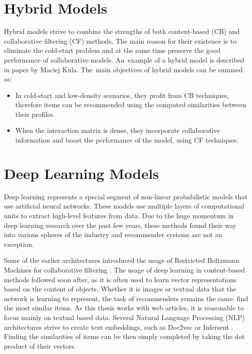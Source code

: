 \section{Hybrid Models} \label{hybrid_models}

Hybrid models strive to combine the strengths of both content-based (CB) and collaborative filtering (CF) methods. The main reason for their existence is to eliminate the cold-start problem and at the same time preserve the good performance of collaborative models. An~example of a hybrid model is described in paper \cite{LightFM} by Maciej Kula. 
The~main objectives of hybrid models can be summed as:

\begin{itemize}
    \item In cold-start and low-density scenarios, they profit from CB techniques, therefore items can be recommended using the computed similarities between their profiles.
    
    \item When the interaction matrix is dense, they incorporate collaborative information and boost the performance of the model, using CF techniques.
\end{itemize}


\section{Deep Learning Models} \label{deep_learning}
Deep learning represents a special segment of non-linear probabilistic models that use artificial neural networks. These models use multiple layers of computational units to extract high-level features from data. Due to the huge momentum in deep learning research over the past few years, these methods found their way into various spheres of the industry and recommender systems are not an exception. 

Some of the earlier architectures introduced the usage of Restricted Boltzmann Machines for collaborative filtering \cite{Boltzmann}. The usage of deep learning in content-based methods followed soon after, as it is often used to learn vector representations based on the content of objects. Whether it is images or textual data that the network is learning to represent, the task of recommenders remains the same: find the most similar items. As this thesis works with web articles, it is reasonable to focus mainly on textual based data. Several Natural Language Processing (NLP) architectures strive to create text embeddings, such as Doc2vec \cite{Doc2Vec} or Infersent \cite{InferSent}. Finding the similarities of items can be then simply completed by taking the dot product of their vectors.

